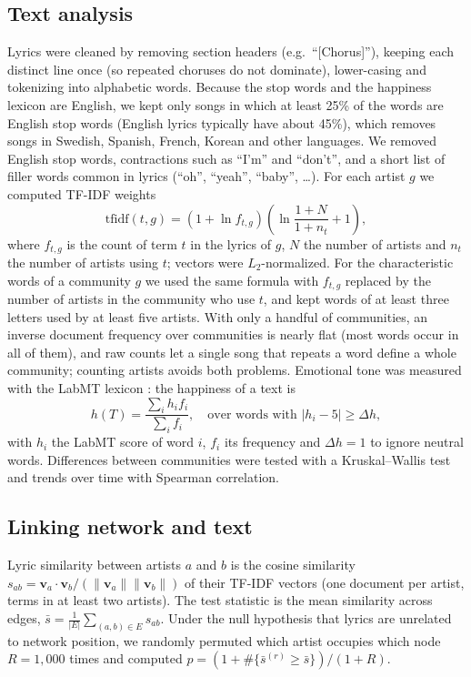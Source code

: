 \documentclass[9pt,twocolumn,twoside]{pnas-new}
\begin{document}
{\subsection*{Text analysis}
Lyrics were cleaned by removing section headers (e.g.\ ``[Chorus]''), keeping each distinct line once (so repeated choruses do not dominate), lower-casing and tokenizing into alphabetic words. Because the stop words and the happiness lexicon are English, we kept only songs in which at least 25\% of the words are English stop words (English lyrics typically have about 45\%), which removes songs in Swedish, Spanish, French, Korean and other languages. We removed English stop words, contractions such as ``I'm'' and ``don't'', and a short list of filler words common in lyrics (``oh'', ``yeah'', ``baby'', \ldots). For each artist $g$ we computed TF-IDF weights \cite{salton1988}
\begin{equation}
\mathrm{tfidf}(t,g) = \left(1+\ln f_{t,g}\right)\left(\ln\frac{1+N}{1+n_t}+1\right),
\end{equation}
where $f_{t,g}$ is the count of term $t$ in the lyrics of $g$, $N$ the number of artists and $n_t$ the number of artists using $t$; vectors were $L_2$-normalized. For the characteristic words of a community $g$ we used the same formula with $f_{t,g}$ replaced by the number of artists in the community who use $t$, and kept words of at least three letters used by at least five artists. With only a handful of communities, an inverse document frequency over communities is nearly flat (most words occur in all of them), and raw counts let a single song that repeats a word define a whole community; counting artists avoids both problems. Emotional tone was measured with the LabMT lexicon \cite{dodds2011}: the happiness of a text is
\begin{equation}
h(T) = \frac{\sum_i h_i f_i}{\sum_i f_i}, \quad \text{over words with } |h_i - 5| \geq \Delta h,
\end{equation}
with $h_i$ the LabMT score of word $i$, $f_i$ its frequency and $\Delta h = 1$ to ignore neutral words. Differences between communities were tested with a Kruskal--Wallis test and trends over time with Spearman correlation.

\subsection*{Linking network and text}
Lyric similarity between artists $a$ and $b$ is the cosine similarity $s_{ab}=\mathbf{v}_a\cdot\mathbf{v}_b/(\|\mathbf{v}_a\|\|\mathbf{v}_b\|)$ of their TF-IDF vectors (one document per artist, terms in at least two artists). The test statistic is the mean similarity across edges, $\bar{s}=\frac{1}{|E|}\sum_{(a,b)\in E}s_{ab}$. Under the null hypothesis that lyrics are unrelated to network position, we randomly permuted which artist occupies which node $R=1{,}000$ times and computed $p=(1+\#\{\bar{s}^{(r)}\geq\bar{s}\})/(1+R)$.

}
\end{document}
